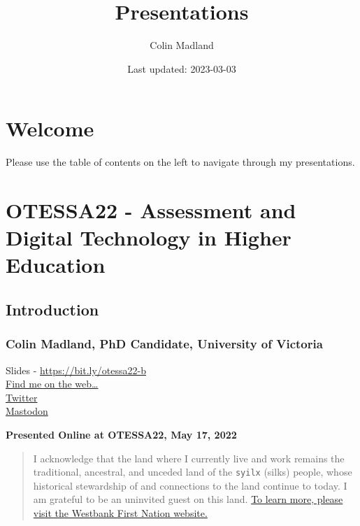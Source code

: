 \documentclass[
]{book}
\title{Presentations}
\author{Colin Madland}
\date{Last updated: 2023-03-03}
\begin{document}
\maketitle

{
\setcounter{tocdepth}{1}
\tableofcontents
}
\hypertarget{welcome}{%
\chapter*{Welcome}\label{welcome}}

Please use the table of contents on the left to navigate through my presentations.

\hypertarget{otessa22---assessment-and-digital-technology-in-higher-education}{%
\chapter{OTESSA22 - Assessment and Digital Technology in Higher Education}\label{otessa22---assessment-and-digital-technology-in-higher-education}}

\hypertarget{introduction}{%
\section*{Introduction}\label{introduction}}

\hypertarget{colin-madland-phd-candidate-university-of-victoria}{%
\subsection*{Colin Madland, PhD Candidate, University of Victoria}\label{colin-madland-phd-candidate-university-of-victoria}}

Slides - \url{https://bit.ly/otessa22-b}\\
\href{https://cmad.land}{Find me on the web\ldots{}}\\
\href{https://twitter.com/colinmadland}{Twitter}\\
\href{https://scholar.social/web/@Cmadland}{Mastodon}

\textbf{Presented Online at OTESSA22, May 17, 2022}

\begin{quote}
I acknowledge that the land where I currently live and work remains the traditional, ancestral, and unceded land of the \texttt{syilx} (silks) people, whose historical stewardship of and connections to the land continue to today. I am grateful to be an uninvited guest on this land. \href{https://wfn.ca}{To learn more, please visit the Westbank First Nation website.}
\end{quote}
\end{document}
